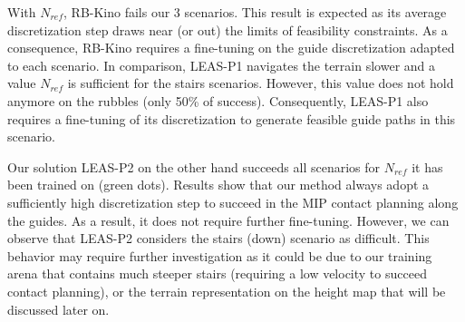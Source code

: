 With $N_{ref}$, RB-Kino fails our 3 scenarios. This result is expected as its average discretization step draws near (or out) the limits of feasibility constraints.
As a consequence, RB-Kino requires a fine-tuning on the guide discretization adapted to each scenario.
In comparison, LEAS-P1 navigates the terrain slower and a value $N_{ref}$ is sufficient for the stairs scenarios. 
However, this value does not hold anymore on the rubbles (only 50\% of success). 
Consequently, LEAS-P1 also requires a fine-tuning of its discretization to generate feasible guide paths in this scenario.

Our solution LEAS-P2 on the other hand succeeds all scenarios for $N_{ref}$ it has been trained on (green dots).
Results show that our method always adopt a sufficiently high discretization step to succeed in the MIP contact planning along the guides. %
As a result, it does not require further fine-tuning.
However, we can observe that LEAS-P2 considers the stairs (down) scenario as difficult.
This behavior may require further investigation as it could be due to our training arena that contains much steeper stairs (requiring a low velocity to succeed contact planning), or the terrain representation on the height map that will be discussed later on.

